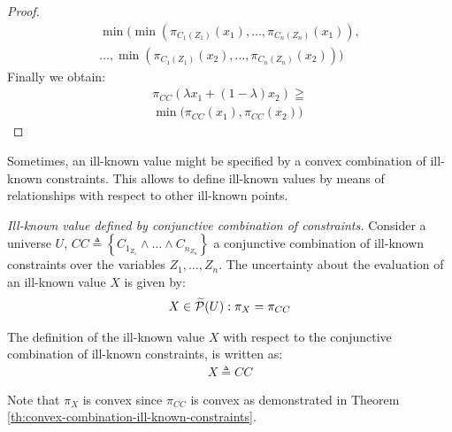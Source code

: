 \begin{proof}
\begin{align}
\nonumber
\min \big( \min \left(\pi_{C_1(Z_1)} \left( x_1 \right), \ldots, \pi_{C_n(Z_n)} \left( x_1 \right) \right),\\
\nonumber
\ldots, \min \left(\pi_{C_1(Z_1)} \left( x_2 \right), \ldots, \pi_{C_n(Z_n)} \left( x_2 \right) \right) \big)
\end{align}
Finally we obtain:
\begin{align}
\label{eq:proof-convex5}
\pi_{CC} \left( \lambda x_1 + \left( 1 - \lambda \right)x_2 \right) \geqq  \\
\nonumber
\min \big(\pi_{CC} \left( x_1 \right), \pi_{CC} \left( x_2 \right) \big)
\end{align}
\end{proof}

Sometimes, an ill-known value might be specified by a convex combination of ill-known constraints. This allows to define ill-known values by means of relationships with respect to other ill-known points.


\begin{definition}
\label{def:convex-combination-ill-known-constraints}
\emph{Ill-known value defined by conjunctive combination of constraints.}
Consider a universe $U$, $CC \triangleq \left \lbrace C_{1_{Z_1}} \wedge \ldots \wedge C_{n_{Z_n}}  \right \rbrace$ a conjunctive combination of ill-known constraints over the variables $Z_1, \ldots, Z_n$. The uncertainty about the evaluation of an ill-known value $X$ is given by:
\begin{align}
\label{eq:ill-known-value-def-by-const-unc}
X \in \widetilde{\mathcal{P}}(U):\pi_{X}=\pi_{CC}
\end{align} 

The definition of the ill-known value $X$ with respect to the conjunctive combination of ill-known constraints, is written as:
\begin{align}
\label{eq:ill-known-value-by-convex-constraints}
X \triangleq CC 
\end{align}


Note that $\pi_{X}$ is convex since $\pi_{CC}$ is convex as demonstrated in Theorem \ref{th:convex-combination-ill-known-constraints}.
\end{definition}


